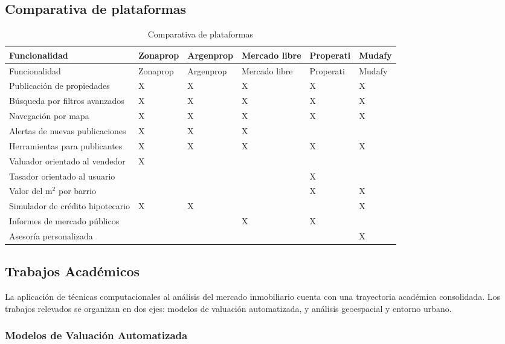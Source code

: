 \subsection{Comparativa de plataformas}

\begin{center}
\scriptsize
\begin{longtable}{|p{}|*{5}{>{\centering\arraybackslash}p{}|}}
\caption{Comparativa de plataformas}\label{tab:comparativa-plataformas}\\
\hline
Funcionalidad & Zonaprop & Argenprop & Mercado libre & Properati & Mudafy \\
\hline
\endfirsthead
\hline
Funcionalidad & Zonaprop & Argenprop & Mercado libre & Properati & Mudafy \\
\hline
\endhead
Publicación de propiedades & X & X & X & X & X \\
\hline
Búsqueda por filtros avanzados & X & X & X & X & X \\
\hline
Navegación por mapa & X & X & X & X & X \\
\hline
Alertas de nuevas publicaciones & X & X & X &  &  \\
\hline
Herramientas para publicantes & X & X & X & X & X \\
\hline
Valuador orientado al vendedor & X &  &  &  &  \\
\hline
Tasador orientado al usuario &  &  &  & X &  \\
\hline
Valor del m$^2$ por barrio &  &  &  & X & X \\
\hline
Simulador de crédito hipotecario & X & X &  &  & X \\
\hline
Informes de mercado públicos &  &  & X & X &  \\
\hline
Asesoría personalizada &  &  &  &  & X \\
\hline
\end{longtable}
\end{center}

\subsection{Trabajos Académicos}

La aplicación de técnicas computacionales al análisis del mercado inmobiliario cuenta con una trayectoria académica consolidada. Los trabajos relevados se organizan en dos ejes: modelos de valuación automatizada, y análisis geoespacial y entorno urbano.

\subsubsection{Modelos de Valuación Automatizada}

